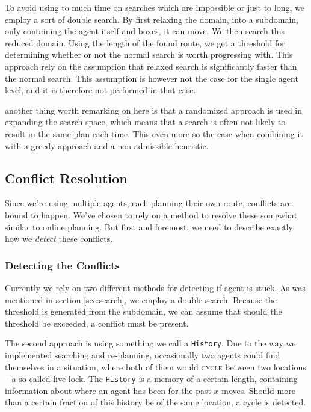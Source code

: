 \documentclass[letterpaper]{article}
\begin{document}
		
		To avoid using to much time on searches which are impossible or just to long, we employ a sort of double search. By first relaxing the domain, into a subdomain, only containing the agent itself and boxes, it can move. We then search this reduced domain. Using the length of the found route, we get a threshold for determining whether or not the normal search is worth progressing with. This approach rely on the assumption that relaxed search is significantly faster than the normal search. This assumption is however not the case for the single agent level, and it is therefore not performed in that case.
		
		
		
		
		another thing worth remarking on here is that a randomized approach is used in expanding the search space, which means that a search is often not likely to result in the same plan each time. This even more so the case when combining it with a greedy approach and a non admissible heuristic.




	\subsection{Conflict Resolution}
		Since we're using multiple agents, each planning their own route, conflicts are bound to happen. We've chosen to rely on a method to resolve these somewhat similar to online planning. But first and foremost, we need to describe exactly how we \emph{detect} these conflicts.

		\subsubsection{Detecting the Conflicts}
			Currently we rely on two different methods for detecting if agent is stuck. As was mentioned in section \ref{sec:search}, we employ a double search. Because the threshold is generated from the subdomain, we can assume that should the threshold be exceeded, a conflict must be present.

			The second approach is using something we call a \verb=History=. Due to the way we implemented searching and re-planning, occasionally two agents could find themselves in a situation, where both of them would \textsc{cycle} between two locations -- a so called live-lock. The \verb=History= is a memory of a certain length, containing information about where an agent has been for the past $x$ moves. Should more than a certain fraction of this history be of the same location, a cycle is detected.
\end{document}
